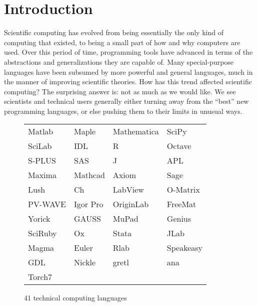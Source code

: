 \chapter{Introduction}

Scientific computing has evolved from being essentially the only kind of
computing that existed, to being a small part of how and why computers
are used.
Over this period of time, programming tools have advanced in terms of
the abstractions and generalizations they are capable of.
Many special-purpose languages have been subsumed by more powerful and
general languages, much in the manner of improving scientific theories.
How has this trend affected scientific computing?
The surprising answer is: not as much as we would like.
We see scientists and technical users generally either turning away
from the ``best'' new programming languages, or else pushing them
to their limits in unusual ways.


\begin{figure}
  \begin{center}
    \begin{tabular}{|llll|}\hline
Matlab  &  Maple &  Mathematica & SciPy \\
SciLab  &  IDL   &  R  & Octave \\
S-PLUS  & SAS & J & APL \\
Maxima & Mathcad & Axiom & Sage \\
Lush & Ch & LabView & O-Matrix \\
PV-WAVE & Igor Pro & OriginLab & FreeMat \\
Yorick & GAUSS & MuPad & Genius \\
SciRuby & Ox & Stata & JLab \\
Magma & Euler & Rlab & Speakeasy \\
GDL & Nickle & gretl & ana \\
Torch7 &&& \\
\hline
    \end{tabular}
  \end{center}
  \caption{
    41 technical computing languages
  }
  \label{gangof40}
\end{figure}

